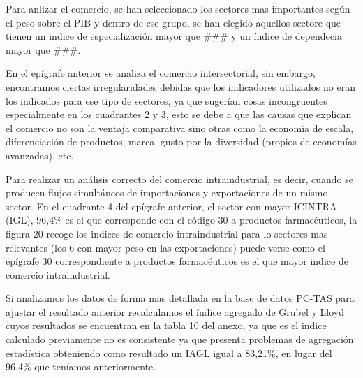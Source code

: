 \documentclass[a4paper,openright,12pt]{book}
\begin{document}
Para anlizar el comercio, se han seleccionado los sectores mas importantes según el peso sobre el PIB y dentro de ese grupo, se han elegido aquellos sectore que tienen un indice de especialización mayor que ### y un índice de dependecia mayor que ###.

En el epígrafe anterior se analiza el comercio intersectorial, sin embargo, encontramos ciertas irregularidades debidas que los indicadores utilizados no eran los indicados para ese tipo de sectores, ya que sugerían cosas incongruentes especialmente en los cuadrantes 2 y 3, esto se debe a que las causas que explican el comercio no son la ventaja comparativa sino otras como la economía de escala, diferenciación de productos, marca, gusto por la diversidad (propios de economías avanzadas), etc.

Para realizar un análisis correcto del comercio intraindustrial, es decir, cuando se producen flujos simultáneos de importaciones y exportaciones de un mismo sector. En el cuadrante 4 del epígrafe anterior, el sector con mayor ICINTRA (IGL), 96,4\% es el que corresponde con el código 30 a productos farmacéuticos, la figura 20 recoge los indices de comercio intraindustrial para lo sectores mas relevantes (los 6 con mayor peso en las exportaciones) puede verse como el epígrafe 30 correspondiente a productos farmacéuticos es el que mayor indice de comercio intraindustrial.

Si analizamos los datos de forma mas detallada en la base de datos PC-TAS para ajustar el resultado anterior recalculamos el índice agregado de Grubel y Lloyd cuyos resultados se encuentran en la tabla 10 del anexo, ya que es el indice calculado previamente no es consistente ya que presenta problemas de agregación estadística obteniendo como resultado un IAGL igual a 83,21\%, en lugar del 96,4\% que teníamos anteriormente.

\end{document}
